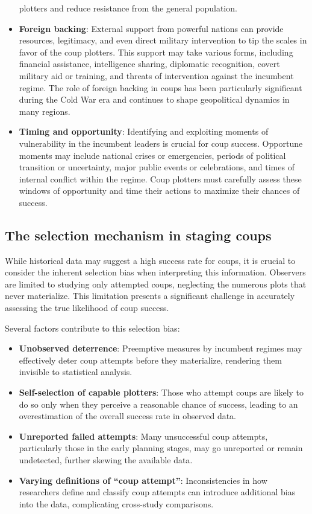 \documentclass[
  12pt,
]{report}
\begin{document}
\begin{itemize}
  plotters and reduce resistance from the general population.
\item
  \textbf{Foreign backing}: External support from powerful nations can
  provide resources, legitimacy, and even direct military intervention
  to tip the scales in favor of the coup plotters. This support may take
  various forms, including financial assistance, intelligence sharing,
  diplomatic recognition, covert military aid or training, and threats
  of intervention against the incumbent regime. The role of foreign
  backing in coups has been particularly significant during the Cold War
  era and continues to shape geopolitical dynamics in many regions.
\item
  \textbf{Timing and opportunity}: Identifying and exploiting moments of
  vulnerability in the incumbent leaders is crucial for coup success.
  Opportune moments may include national crises or emergencies, periods
  of political transition or uncertainty, major public events or
  celebrations, and times of internal conflict within the regime. Coup
  plotters must carefully assess these windows of opportunity and time
  their actions to maximize their chances of success.
\end{itemize}

\subsection{The selection mechanism in staging
coups}\label{the-selection-mechanism-in-staging-coups}

While historical data may suggest a high success rate for coups, it is
crucial to consider the inherent selection bias when interpreting this
information. Observers are limited to studying only attempted coups,
neglecting the numerous plots that never materialize. This limitation
presents a significant challenge in accurately assessing the true
likelihood of coup success.

Several factors contribute to this selection bias:

\begin{itemize}
\item
  \textbf{Unobserved deterrence}: Preemptive measures by incumbent
  regimes may effectively deter coup attempts before they materialize,
  rendering them invisible to statistical analysis.
\item
  \textbf{Self-selection of capable plotters}: Those who attempt coups
  are likely to do so only when they perceive a reasonable chance of
  success, leading to an overestimation of the overall success rate in
  observed data.
\item
  \textbf{Unreported failed attempts}: Many unsuccessful coup attempts,
  particularly those in the early planning stages, may go unreported or
  remain undetected, further skewing the available data.
\item
  \textbf{Varying definitions of ``coup attempt''}: Inconsistencies in
  how researchers define and classify coup attempts can introduce
  additional bias into the data, complicating cross-study comparisons.
\end{itemize}
\end{document}
